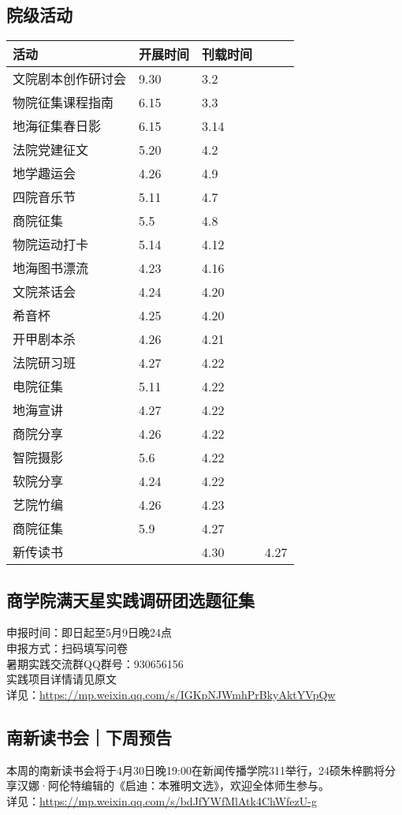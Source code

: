 \documentclass[letterpaper, 12pt]{article}
\begin{document}
\begin{multicols}{2}
\section{院级活动}
\begin{tabular}{|>{\centering\arraybackslash}m{}|m{}|m{}|}
\hline
    活动 & 开展时间 & 刊载时间\\
    \hline\hline
    文院剧本创作研讨会 & 9.30 & 3.2\\
    物院征集课程指南 & 6.15 & 3.3\\
    地海征集春日影 & 6.15 & 3.14\\
    法院党建征文 & 5.20 & 4.2\\
    地学趣运会 & 4.26 & 4.9\\
    四院音乐节 & 5.11 & 4.7\\
    商院征集 & 5.5 & 4.8\\
    物院运动打卡 & 5.14 & 4.12\\
    地海图书漂流 & 4.23 & 4.16\\
    文院茶话会 & 4.24 & 4.20\\
    希音杯 & 4.25 & 4.20\\
    开甲剧本杀 & 4.26 & 4.21\\
    法院研习班 & 4.27 & 4.22\\
    电院征集 & 5.11 & 4.22\\
    地海宣讲 & 4.27 & 4.22\\
    商院分享 & 4.26 & 4.22\\
    智院摄影 & 5.6 & 4.22\\
    软院分享 & 4.24 & 4.22\\
    艺院竹编 & 4.26 & 4.23\\
    商院征集 & 5.9 & 4.27\\
    新传读书 & & 4.30 & 4.27\\
    \hline
\end{tabular}
\subsection{商学院满天星实践调研团选题征集} %
申报时间：即日起至5月9日晚24点
\\申报方式：扫码填写问卷
\\暑期实践交流群QQ群号：930656156
\\实践项目详情请见原文
\\详见：\url{https://mp.weixin.qq.com/s/IGKpNJWmhPrBkyAktYVpQw}

\subsection{南新读书会｜下周预告} %
本周的南新读书会将于4月30日晚19:00在新闻传播学院311举行，24硕朱梓鹏将分享汉娜·阿伦特编辑的《启迪：本雅明文选》，欢迎全体师生参与。
\\详见：\url{https://mp.weixin.qq.com/s/bdJfYWfMlAtk4ChWfezU-g}



\end{multicols}
\end{document}

